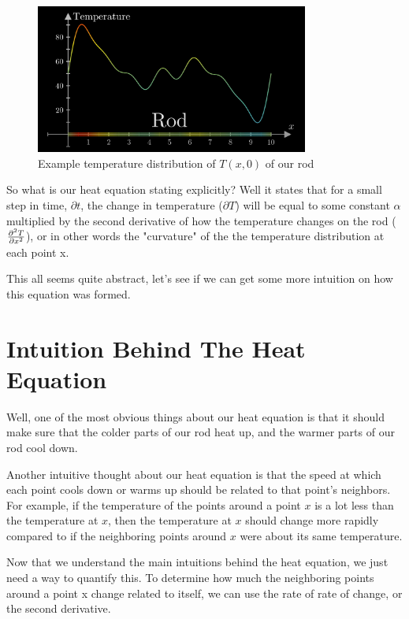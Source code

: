 \documentclass{report}
\begin{document}
\begin{figure}[h]
    \centering
    \includegraphics[width=0.8\textwidth]{images/temperature_distribution_on_rod.PNG}
    \caption{Example temperature distribution of $T(x,0)$ of our rod}
\end{figure}

So what is our heat equation stating explicitly? 
Well it states that for a small step in time, $\partial t$, the change in temperature ($\partial T$)
will be equal to some constant $\alpha$ multiplied by the second derivative of how the 
temperature changes on the rod ($\pdv[2]{T}{x}$), or in other words the "curvature" of the
the temperature distribution at each point x.

This all seems quite abstract, let's see if we can get some more intuition on how this equation was formed.

\section{Intuition Behind The Heat Equation}

Well, one of the most obvious things about our heat equation is that it should make sure 
that the colder parts of our rod heat up, and the warmer parts of our rod cool down. 

Another intuitive thought about our heat equation is that the speed at which each point cools down or warms up
should be related to that point's neighbors. For example, if the temperature of the points around 
a point $x$ is a lot less than the temperature at $x$, then the temperature at $x$ should change
more rapidly compared to if the neighboring points around $x$ were about its same temperature. 

Now that we understand the main intuitions behind the heat equation, we just need a way to quantify this.
To determine how much the neighboring points around a point x change related to itself, we can use 
the rate of rate of change, or the second derivative. 
\end{document}
